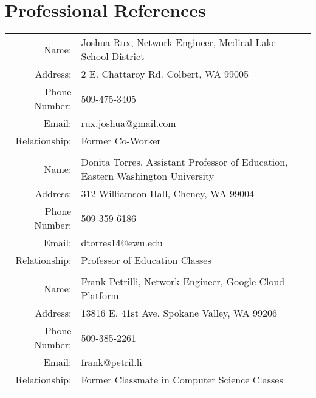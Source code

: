 \documentclass[a4paper,10pt]{article}
\begin{document}
\newpage

\section{Professional References}

\begin{tabular}{r|p{14cm}}
	Name: & Joshua Rux, Network Engineer, Medical Lake School District\\ 
	Address: & 2 E. Chattaroy Rd. Colbert, WA 99005\\
	Phone Number: & 509-475-3405 \\
	Email: & rux.joshua@gmail.com\\
	Relationship: & Former Co-Worker\\
	\multicolumn{2}{c}{}\\

	Name: & Donita Torres, Assistant Professor of Education, Eastern Washington University \\
	Address: & 312 Williamson Hall, Cheney, WA 99004\\
	Phone Number: & 509-359-6186\\
	Email: & dtorres14@ewu.edu\\
	Relationship: & Professor of Education Classes\\
	\multicolumn{2}{c}{}\\

	Name: & Frank Petrilli, Network Engineer, Google Cloud Platform \\
	Address: & 13816 E. 41st Ave. Spokane Valley, WA 99206\\
	Phone Number: & 509-385-2261\\
	Email: & frank@petril.li\\
	Relationship: & Former Classmate in Computer Science Classes\\
	\multicolumn{2}{c}{}\\
\end{tabular}
\end{document}
